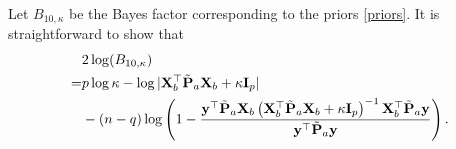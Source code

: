 \documentclass[smallextended]{svjour3}       %
\DeclareMathOperator{\myRank}{Rank}
\newcommand{\By}{\mathbf{y}}    \newcommand{\Bz}{\mathbf{z}}
\newcommand{\bfsym}[1]{\ensuremath{\boldsymbol{#1}}}
\def\bbeta{\bfsym \beta}
\begin{document}

Let $B_{10,\kappa} $ be the Bayes factor corresponding to the priors \eqref{priors}.
 It is straightforward to show that
\begin{equation*}
    \begin{split}
        &2\log (B_{10,{\kappa}})
        \\
        =  &
    p\log \kappa
    -
        \log |\BX_b^\top \tilde \BP_a \BX_b + \kappa \BI_p |
    \\
    &
    -(n-q)\log \left(
            1-
        \frac{
            \By^\top \tilde \BP_a \BX_b
            \left(\BX_b^\top  \tilde \BP_a \BX_b + \kappa \BI_p\right)^{-1}
            \BX_b^\top \tilde \BP_a \By
        }{
            \By^\top \tilde \BP_a \By
        }
    \right).
    \end{split}
\end{equation*}
\end{document}
